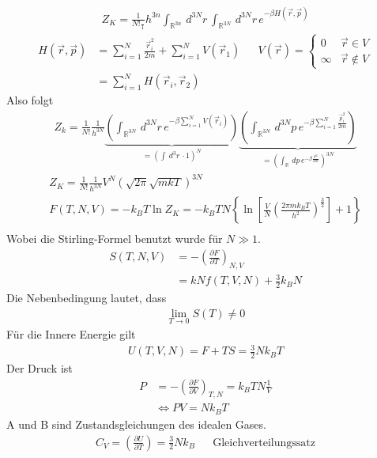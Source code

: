 \documentclass[11pt]{article}
\theoremstyle{plain}
\theoremstyle{mytheoremstyle}
\newcommand{\R}{\mathbb{R}}
\newcommand{\pd}[2]{\frac{\partial #1 }{\partial #2}}
\renewcommand{\d}[1]{\,d#1\,}
\begin{document}
%
\begin{align*}
  Z_K = \frac{1}{N!\frac{}1}{h^{3n}} \int_{\R^{3n}}^{} \d{^{3N}r}
  \int_{\R^{3N}}^{} \d{^{3N}r} e^{-\beta H (\vec{r}, \vec{p})} 
\end{align*}
%
%
\begin{align*}
  H(\vec{r}, \vec{p}) & = \sum_{i=1}^{ N} \frac{\vec{r}_i^2}{2m} +
  \sum_{i=1}^{N} V(\vec{r}_1) && V(\vec{r}) = \begin{cases}
  0 & \vec{r} \in V \\
  \infty & \vec{r} \not \in V
  \end{cases} 
  \\ & = \sum_{i=1}^{N} H(\vec{r}_i, \vec{r}_2)
\end{align*}
%
Also folgt %
\begin{align*}
  Z_k = \frac{1}{N!} \frac{1}{h^{3N}} \underbrace{\left(  \int_{\R^{3N}}^{}
  \d{^{3N} r} e^{-\beta \sum_{i=1}^{N} V(\vec{r}_i)} \right)
}_{= \left( \int_{}^{} \d{^3r}  \cdot 1 \right)^N}  \underbrace{\left( \int_{\R^{3N}}^{} \d{^{3N}p} e^{-\beta \sum_{i=1}^{N} \frac{\vec{p}_i^2}{2m}} \right)
}_{= \left( \int_{\R}^{} \d{p} e^{-\beta \frac{p^2}{2m}} \right)^{3N}}
\end{align*}
%
%
\begin{align*}
  Z_K = \frac{1}{N!} \frac{1}{h^{3N}} V^N \left( \sqrt{2 \pi} \sqrt{m k T} \right)^{3N} \\
  F(T, N, V) = -k_B T \ln{Z_K} = -k_B T N
  \left\{ \ln{ \left[ \frac{V}{N} (\frac{2 \pi m k_B T}{h^2})^\frac{3}{2} \right]
  + 1} \right\} \\ 
\end{align*}
%
Wobei die Stirling-Formel benutzt wurde f\"ur $N \gg 1$.
%
\begin{align*}
  S(T, N, V) & = - \left( \pd{F}{T} \right)_{N,V} \\
             & = k N f(T, V, N) + \frac{3}{2} k_B N
\end{align*}
%
Die Nebenbedingung lautet, dass
%
\begin{align*}
  \lim_{T\to  0 } S(T) \neq 0
\end{align*}
%
F\"ur die Innere Energie gilt
%
\begin{align}
  U(T, V, N) = F + TS = \frac{3}{2} N k_B T
  \label{eq:A}
\end{align}
%
Der Druck ist 
%
\begin{align}
  P & = - \left( \pd{F}{V} \right)_{T, N} = k_B T N \frac{1}{V} \\
    & \iff PV = N k_B T
  \label{eq:B}
\end{align}
%
A und B sind Zustandsgleichungen des idealen Gases.
%
\begin{align*}
  C_V = ( \pd{U}{T} ) = \frac{3}{2} N k_B && \text{Gleichverteilungssatz}
\end{align*}
%
\end{document}

